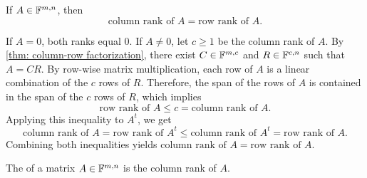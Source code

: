 \begin{thm}
  \label{thm: column rank equals row rank}
  If $A\in \mathbb{F}^{m,n}$, then
  \begin{equation}
    \text{column rank of } A = \text{row rank of } A.
  \end{equation}
\end{thm}
\begin{prf}
  If $A = 0$, both ranks equal $0$. If $A \neq 0$, let $c \ge 1$ be the column rank of $A$.
  By \ref{thm: column-row factorization}, there exist $C \in \mathbb{F}^{m,c}$ and $R \in \mathbb{F}^{c,n}$ such that $A = CR$.
  By row-wise matrix multiplication, each row of $A$ is a linear combination of the $c$ rows of $R$.
  Therefore, the span of the rows of $A$ is contained in the span of the $c$ rows of $R$, which implies
  \begin{equation}
    \text{row rank of } A \leq c = \text{column rank of } A.
  \end{equation}
  Applying this inequality to $A^t$, we get
  \begin{equation}
    \text{column rank of } A = \text{row rank of } A^t \leq \text{column rank of } A^t = \text{row rank of } A.
  \end{equation}
  Combining both inequalities yields $\text{column rank of } A = \text{row rank of } A$.
\end{prf}

\begin{mydef} [rank]
  The  of a matrix $A \in  \mathbb{F}^{m,n}$ is the column rank of $A$.
\end{mydef}